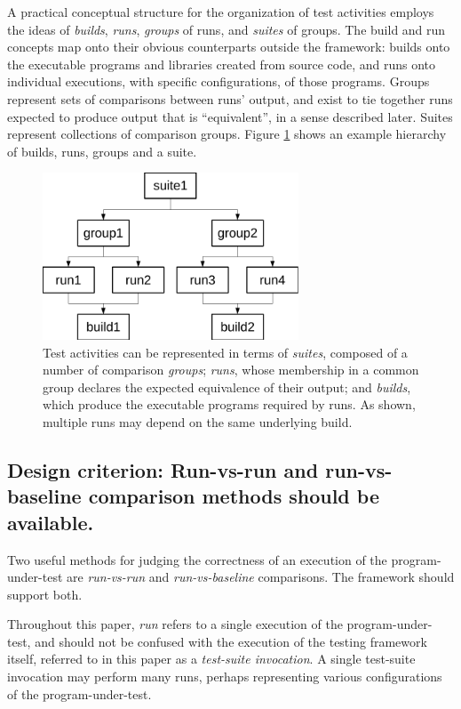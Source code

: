 \documentclass[conference]{IEEEtran}
\begin{document}
A practical conceptual structure for the organization of test activities employs the ideas of \emph{builds}, \emph{runs}, \emph{groups} of runs, and \emph{suites} of groups. The build and run concepts map onto their obvious counterparts outside the framework: builds onto the executable programs and libraries created from source code, and runs onto individual executions, with specific configurations, of those programs. Groups represent sets of comparisons between runs' output, and exist to tie together runs expected to produce output that is ``equivalent'', in a sense described later. Suites represent collections of comparison groups. Figure \ref{figure:1} shows an example hierarchy of builds, runs, groups and a suite.

\begin{figure}[!t]
\centering
\includegraphics[width=3in]{fig5.pdf}
\caption{Test activities can be represented in terms of \emph{suites}, composed of a number of comparison \emph{groups}; \emph{runs}, whose membership in a common group declares the expected equivalence of their output; and \emph{builds}, which produce the executable programs required by runs. As shown, multiple runs may depend on the same underlying build.}
\label{figure:1}
\end{figure}

\subsection{Design criterion: Run-vs-run and run-vs-baseline comparison methods should be available.}

Two useful methods for judging the correctness of an execution of the program-under-test are \emph{run-vs-run} and \emph{run-vs-baseline} comparisons. The framework should support both.

Throughout this paper, \emph{run} refers to a single execution of the program-under-test, and should not be confused with the execution of the testing framework itself, referred to in this paper as a \emph{test-suite invocation}. A single test-suite invocation may perform many runs, perhaps representing various configurations of the program-under-test.
\end{document}

